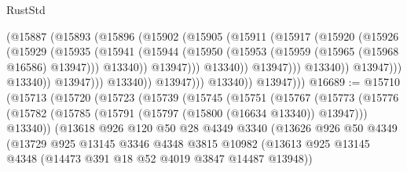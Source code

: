 \begin{lexlean}{RustStd}
\begin{coremodule}
                                    (@15887
                                      (@15893
                                        (@15896
                                          (@15902
                                            (@15905
                                              (@15911
                                                (@15917
                                                  (@15920
                                                    (@15926
                                                      (@15929
                                                        (@15935
                                                          (@15941
                                                            (@15944
                                                              (@15950
                                                                (@15953
                                                                  (@15959
                                                                    (@15965
                                                                      (@15968 @16586)
                                                                      @13947)))
                                                                @13340))
                                                            @13947)))
                                                      @13340))
                                                  @13947)))
                                            @13340))
                                        @13947)))
                                  @13340))
                              @13947)))
                        @13340))
                    @13947)))
              @13340))
          @13947)))
@16689 := @15710
    (@15713
      (@15720
        (@15723
          (@15739
            (@15745
              (@15751
                (@15767
                  (@15773
                    (@15776
                      (@15782 (@15785 (@15791 (@15797 (@15800 (@16634 @13340)) @13947))) @13340))
                    (@13618
                      @926
                      @120
                      @50
                      @28
                      @4349
                      @3340
                      (@13626
                        @926
                        @50
                        @4349
                        (@13729
                          @925
                          @13145
                          @3346
                          @4348
                          @3815
                          @10982
                          (@13613 @925 @13145 @4348 (@14473 @391 @18 @52 @4019 @3847 @14487 @13948))

\end{coremodule}
\end{lexlean}
